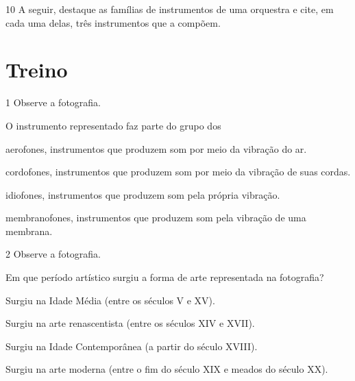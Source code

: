 \num{10} A seguir, destaque as famílias de instrumentos de uma orquestra e
cite, em cada uma delas, três instrumentos que a compõem.


\section{Treino}

\num{1}  Observe a fotografia.


O instrumento representado faz parte do grupo dos

\begin{escolha}
\item
  aerofones, instrumentos que produzem som por meio da vibração do ar.
\item
  cordofones, instrumentos que produzem som por meio da vibração de suas
  cordas.
\item
  idiofones, instrumentos que produzem som pela própria vibração.
\item
  membranofones, instrumentos que produzem som pela vibração de uma
  membrana.
\end{escolha}

\num{2} Observe a fotografia.


Em que período artístico surgiu a forma de arte representada na fotografia?

\begin{escolha}
\item Surgiu na Idade Média (entre os séculos V e XV).

\item Surgiu na arte renascentista (entre os séculos XIV e XVII).

\item Surgiu na Idade Contemporânea (a partir do século XVIII).

\item Surgiu na arte moderna (entre o fim do século XIX e meados do século XX).
\end{escolha}

